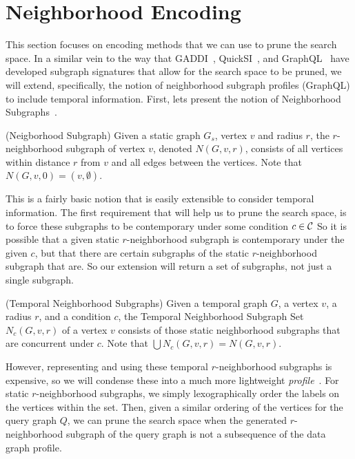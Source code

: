 \section{Neighborhood Encoding}

This section focuses on encoding methods that we can use to prune the search
space. In a similar vein to the way that GADDI~\cite{2009-EDBT-GADDI},
QuickSI~\cite{2008-VLDB-QuickSI}, and GraphQL~\cite{2008-SIGMOD-GraphQL} have
developed subgraph signatures that allow for the search space to be pruned, we
will extend, specifically, the notion of neighborhood subgraph profiles
(GraphQL) to include temporal information. First, lets present the notion of
Neighborhood Subgraphs~\cite{2008-SIGMOD-GraphQL}.

\begin{defn}
  (Neigborhood Subgraph) Given a static graph $G_s$, vertex $v$ and radius $r$,
  the $r$-neighborhood subgraph of vertex $v$, denoted $N(G,v,r)$, consists of
  all vertices within distance $r$ from $v$ and all edges between the
  vertices. Note that $N(G,v,0) = ({v}, \emptyset)$.
\end{defn}

This is a fairly basic notion that is easily extensible to consider temporal
information. The first requirement that will help us to prune the search space,
is to force these subgraphs to be contemporary under some condition $c \in \mathcal{C}$
So it is possible that a given static $r$-neighborhood subgraph is contemporary under the
given $c$, but that there are certain subgraphs of the static $r$-neighborhood
subgraph that are.  So our extension will return a set of subgraphs, not just a
single subgraph.

\begin{defn}
  (Temporal Neighborhood Subgraphs) Given a temporal graph $G$, a vertex $v$, a
  radius $r$, and a condition $c$, the Temporal Neighborhood Subgraph Set
  $N_c(G,v,r)$ of a vertex $v$ consists of those static neighborhood subgraphs
  that are concurrent under $c$. Note that $\displaystyle\bigcup N_c(G,v,r) =
  N(G,v,r)$.
\end{defn}

However, representing and using these temporal $r$-neighborhood subgraphs is
expensive, so we will condense these into a much more lightweight
\textit{profile}~\cite{2008-SIGMOD-GraphQL}. For static $r$-neighborhood
subgraphs, we simply lexographically order the labels on the vertices within the
set. Then, given a similar ordering of the vertices for the query graph $Q$, we
can prune the search space when the generated $r$-neighborhood subgraph of the
query graph is not a subsequence of the data graph profile.

